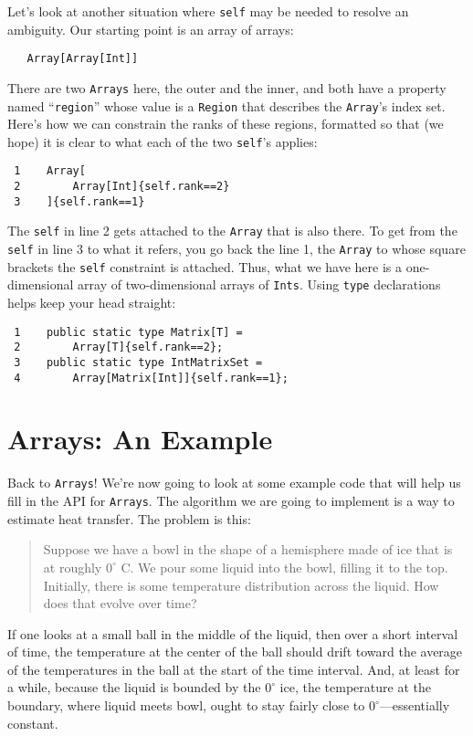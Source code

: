 Let's look at another situation where {\tt self} may be needed to resolve an ambiguity.
Our starting point is an array of arrays:
\begin{verbatim}
   Array[Array[Int]]
\end{verbatim} 
There are two {\tt Arrays} here, the outer and the inner, and both have a
property named ``{\tt region}'' whose value is a {\tt Region} that describes the
{\tt Array}'s index set. Here's how we can constrain the ranks of these regions,
formatted so that (we hope) it is clear to what each of the two {\tt self}'s applies:
\begin{verbatim}
 1    Array[
 2        Array[Int]{self.rank==2}
 3    ]{self.rank==1}
\end{verbatim}
The {\tt self} in line 2 gets attached to the {\tt Array} that is also there.
To get from the {\tt self} in line 3 to what it refers, you go back the
line 1, the {\tt Array} to whose square brackets the {\tt self} constraint
is attached.  Thus, what we have here is a one-dimensional array of
two-dimensional arrays of {\tt Ints}.  Using {\tt type} declarations helps
keep your head straight:
\begin{verbatim}
 1    public static type Matrix[T] = 
 2        Array[T]{self.rank==2};
 3    public static type IntMatrixSet =
 4        Array[Matrix[Int]]{self.rank==1};
\end{verbatim}

\section{Arrays: An Example}

Back to {\tt Arrays}!
We're now going to look at some example code that will help us fill in the API
for {\tt Arrays}.  The algorithm we are going to implement is a way to
estimate heat transfer.  The problem is this:
\begin{quote}
Suppose we have a bowl in the
shape of a hemisphere made of ice that is at roughly $0^{\circ}$ C. 
We pour some liquid into
the bowl, filling it to the top. Initially, there is some temperature
distribution across the liquid.  How does that evolve over time?  
\end{quote}
If one looks at a small ball in the middle of the liquid,
then over a short interval of time, the temperature at the center of the ball
should drift toward the average of the temperatures in the ball at the start
of the time interval.  And, at least
for a while, because the liquid is bounded by the $0^{\circ}$ ice, the temperature
at the boundary, where liquid meets bowl,
ought to stay fairly close to $0^{\circ}$---essentially constant.

